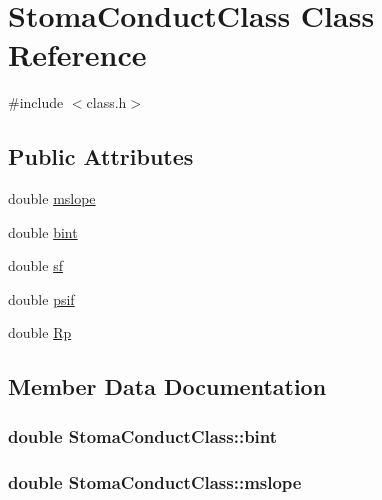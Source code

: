 \hypertarget{class_stoma_conduct_class}{}\section{Stoma\+Conduct\+Class Class Reference}
\label{class_stoma_conduct_class}


{\ttfamily \#include $<$class.\+h$>$}

\subsection*{Public Attributes}
\begin{DoxyCompactItemize}
\item 
double \hyperlink{class_stoma_conduct_class_a8873447cccd259ec70011165d6d01cdd}{mslope}
\item 
double \hyperlink{class_stoma_conduct_class_ae9a85a4a4c6d1982e00be70d9d22de78}{bint}
\item 
double \hyperlink{class_stoma_conduct_class_a415b93e0d5b967fc2a991ff783f537f3}{sf}
\item 
double \hyperlink{class_stoma_conduct_class_a86fb3d6747c331a4059eef983828667f}{psif}
\item 
double \hyperlink{class_stoma_conduct_class_a138392559f3fd5a21f08f02d5c4396b4}{Rp}
\end{DoxyCompactItemize}


\subsection{Member Data Documentation}
\subsubsection[{\texorpdfstring{bint}{bint}}]{\setlength{\rightskip}{0pt plus 5cm}double Stoma\+Conduct\+Class\+::bint}\hypertarget{class_stoma_conduct_class_ae9a85a4a4c6d1982e00be70d9d22de78}{}\label{class_stoma_conduct_class_ae9a85a4a4c6d1982e00be70d9d22de78}
\subsubsection[{\texorpdfstring{mslope}{mslope}}]{\setlength{\rightskip}{0pt plus 5cm}double Stoma\+Conduct\+Class\+::mslope}\hypertarget{class_stoma_conduct_class_a8873447cccd259ec70011165d6d01cdd}{}\label{class_stoma_conduct_class_a8873447cccd259ec70011165d6d01cdd}

